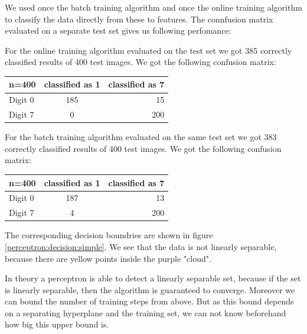 We used once the batch training algorithm and once the online training algorithm to classify the data directly from these to features. The connfusion matrix evaluated on a separate test set gives us following perfomance:

For the online training algorithm evaluated on the test set we got 385 correctly classified results of 400 test images. We got the following confusion matrix:

\begin{tabular}{ l | c | r }
\centering
  n=400 & classified as 1 & classified as 7 \\ \hline
  Digit 0 & 185 & 15 \\
  Digit 7 & 0 & 200 \\
\end{tabular}

For the batch training algorithm evaluated on the same test set we got 383 correctly classified results of 400 test images. We got the following confusion matrix:

\begin{tabular}{ l | c | r }
\centering
  n=400 & classified as 1 & classified as 7 \\ \hline
  Digit 0 & 187 & 13 \\
  Digit 7 & 4 & 200 \\
\end{tabular}

The corresponding decision boundries are shown in figure \ref{perceptron:decision:simple}. We see that the data is not linearly separable, because there are yellow points inside the purple "cloud".

 In theory a perceptron is able to detect a linearly separable set, because if the set is linearly separable, then the algorithm is guaranteed to converge. Moreover we can bound the number of training steps from above. But as this bound depends on a separating hyperplane and the training set, we can not know beforehand how big this upper bound is.

